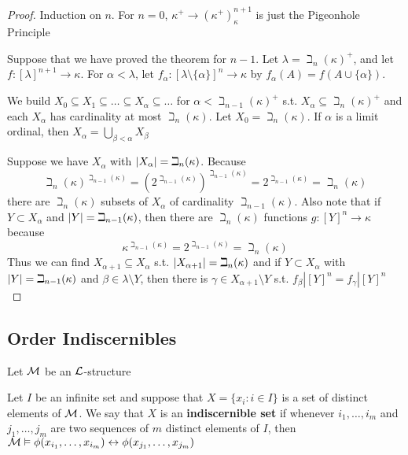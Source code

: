 \documentclass[11pt]{article}
\begin{document}
\begin{proof}
Induction on \(n\). For \(n=0\), \(\kappa^+\to(\kappa^+)^{n+1}_\kappa\) is just the Pigeonhole Principle

Suppose that we have proved the theorem for \(n-1\). Let \(\lambda=\beth_n(\kappa)^+\), and
let \(f:[\lambda]^{n+1}\to\kappa\). For \(\alpha<\lambda\), let \(f_\alpha:[\lambda\setminus\{\alpha\}]^n\to\kappa\) by \(f_\alpha(A)=f(A\cup\{\alpha\})\).

We build \(X_0\subseteq X_1\subseteq\dots\subseteq X_\alpha\subseteq\dots\) for \(\alpha<\beth_{n-1}(\kappa)^+\) s.t. \(X_\alpha\subseteq\beth_n(\kappa)^+\) and each \(X_\alpha\) has
cardinality at most \(\beth_n(\kappa)\). Let \(X_0=\beth_n(\kappa)\). If \(\alpha\) is a limit ordinal,
then \(X_\alpha=\bigcup_{\beta<\alpha}X_\beta\)

Suppose we have \(X_\alpha\) with \(\abs{X_\alpha}=\beth_n(\kappa)\). Because
\begin{equation*}
\beth_n(\kappa)^{\beth_{n-1}(\kappa)}=(2^{\beth_{n-1}(\kappa)})^{\beth_{n-1}(\kappa)}=2^{\beth_{n-1}(\kappa)}=\beth_n(\kappa)
\end{equation*}
there are \(\beth_n(\kappa)\) subsets of \(X_\alpha\) of cardinality \(\beth_{n-1}(\kappa)\). Also note that
if \(Y\subset X_\alpha\) and \(\abs{Y}=\beth_{n-1}(\kappa)\), then there are \(\beth_n(\kappa)\) functions \(g:[Y]^n\to\kappa\)
because
\begin{equation*}
\kappa^{\beth_{n-1}(\kappa)}=2^{\beth_{n-1}(\kappa)}=\beth_n(\kappa)
\end{equation*}
Thus we can find \(X_{\alpha+1}\subseteq X_\alpha\) s.t. \(\abs{X_{\alpha+1}}=\beth_n(\kappa)\) and if \(Y\subset X_\alpha\)
with \(\abs{Y}=\beth_{n-1}(\kappa)\) and \(\beta\in\lambda\setminus Y\), then there is \(\gamma\in X_{\alpha+1}\setminus Y\) s.t.
\(f_\beta|[Y]^n=f_\gamma|[Y]^n\) \label{CANT UNDERSTAND}
\end{proof}
\subsection{Order Indiscernibles}
\label{sec:orge47c706}
Let \(\mathcal{M}\) be an \(\mathcal{L}\)-structure

\begin{definition}[]
Let \(I\) be an infinite set and suppose that \(X=\{x_i:i\in I\}\) is a set of distinct elements
of \(\mathcal{M}\). We say that \(X\) is an \textbf{indiscernible set} if whenever \(i_1,\dots,i_m\) and \(j_1,\dots,j_m\)
are two sequences of \(m\) distinct elements of \(I\),
then \(\mathcal{M}\vDash\phi(x_{i_1},\dots,x_{i_m})\leftrightarrow \phi(x_{j_1},\dots,x_{j_m})\)
\end{definition}
\end{document}
